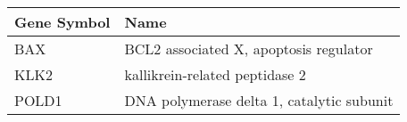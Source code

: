 \begin{tabular}{ll}
\toprule
Gene Symbol &                                      Name \\
\midrule
        BAX &    BCL2 associated X, apoptosis regulator \\
       KLK2 &            kallikrein-related peptidase 2 \\
      POLD1 & DNA polymerase delta 1, catalytic subunit \\
\bottomrule
\end{tabular}
